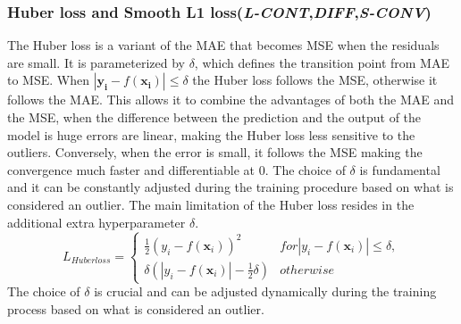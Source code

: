 \documentclass[sn-mathphys-num]{sn-jnl}%
\newcommand \lcont{\textit{L-CONT}}
\newcommand \sconv{\textit{S-CONV}}
\newcommand \diff{\textit{DIFF}}
\renewcommand\vec{\mathbf}
\begin{document}
    \subsubsection{Huber loss  and Smooth L1 loss(\lcont,\diff,\sconv)}\label{subsubsec-regression_Huber}
    The Huber loss \cite{huber1965robust} is a variant of the MAE that becomes MSE when the residuals are small. It is parameterized by $\delta$, which defines the transition point from MAE to MSE. When $ \left | \mathbf{y_i} - f(\mathbf{x_i}) \right | \leq \delta $ the Huber loss follows the MSE, otherwise it follows the MAE.
    This allows it to combine the advantages of both the MAE and the MSE, when the difference between the prediction and the output of the model is huge errors are linear, making the Huber loss less sensitive to the outliers. Conversely, when the error is small, it follows the MSE making the convergence much faster and differentiable at 0.
    The choice of $\delta$ is fundamental and it can be constantly adjusted during the training procedure based on what is considered an outlier. The main limitation of the Huber loss resides in the additional extra hyperparameter $\delta$.
    \begin{equation}
        L_{Huberloss} = \left\{
        \begin{matrix}
            \frac{1}{2} \left ( y_i - f(\vec{x}_i) \right )^{2} &  for \left | y_i - f(\vec{x}_i) \right | \leq \delta,
            \\ \delta \left ( \left | y_i - f(\vec{x}_i) \right | -\frac{1}{2} \delta \right )
            & otherwise
        \end{matrix}\right.
    \end{equation}
    The choice of \(\delta\) is crucial and can be adjusted dynamically during the training process based on what is considered an outlier. 
    
\end{document}
